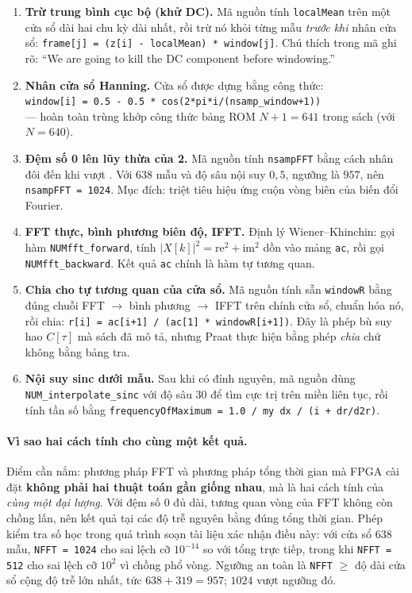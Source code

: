 \documentclass[11pt,a4paper]{article}
\begin{document}
\begin{enumerate}
    \setlength{\itemsep}{1.5pt}
    \item \textbf{Trừ trung bình cục bộ (khử DC).} Mã nguồn tính \texttt{localMean} trên một cửa sổ dài hai chu kỳ dài nhất, rồi trừ nó khỏi từng mẫu \emph{trước khi} nhân cửa sổ: \texttt{frame[j] = (z[i] - localMean) * window[j]}. Chú thích trong mã ghi rõ: ``We are going to kill the DC component before windowing.''
    \item \textbf{Nhân cửa sổ Hanning.} Cửa sổ được dựng bằng công thức:\\\texttt{window[i] = 0.5 - 0.5 * cos(2*pi*i/(nsamp\_window+1))}\\--- hoàn toàn trùng khớp công thức bảng ROM $N+1 = 641$ trong sách (với $N = 640$).
    \item \textbf{Đệm số 0 lên lũy thừa của 2.} Mã nguồn tính \texttt{nsampFFT} bằng cách nhân đôi đến khi vượt . Với $638$ mẫu và độ sâu nội suy $0{,}5$, ngưỡng là $957$, nên \texttt{nsampFFT = 1024}. Mục đích: triệt tiêu hiệu ứng cuộn vòng biên của biến đổi Fourier.
    \item \textbf{FFT thực, bình phương biên độ, IFFT.} Định lý Wiener--Khinchin: gọi hàm \texttt{NUMfft\_forward}, tính $|X[k]|^2 = \text{re}^2 + \text{im}^2$ dồn vào mảng \texttt{ac}, rồi gọi \texttt{NUMfft\_backward}. Kết quả \texttt{ac} chính là hàm tự tương quan.
    \item \textbf{Chia cho tự tương quan của cửa sổ.} Mã nguồn tính sẵn \texttt{windowR} bằng đúng chuỗi FFT $\to$ bình phương $\to$ IFFT trên chính cửa sổ, chuẩn hóa nó, rồi chia: \texttt{r[i] = ac[i+1] / (ac[1] * windowR[i+1])}. Đây là phép bù suy hao $C[\tau]$ mà sách đã mô tả, nhưng Praat thực hiện bằng phép \emph{chia} chứ không bằng bảng tra.
    \item \textbf{Nội suy sinc dưới mẫu.} Sau khi có đỉnh nguyên, mã nguồn dùng \texttt{NUM\_interpolate\_sinc} với độ sâu $30$ để tìm cực trị trên miền liên tục, rồi tính tần số bằng \texttt{frequencyOfMaximum = 1.0 / my dx / (i + dr/d2r)}.
\end{enumerate}

\paragraph{Vì sao hai cách tính cho cùng một kết quả.}
Điểm cần nắm: phương pháp FFT và phương pháp tổng thời gian mà FPGA cài đặt \textbf{không phải hai thuật toán gần giống nhau}, mà là hai cách tính của \emph{cùng một đại lượng}. Với đệm số 0 đủ dài, tương quan vòng của FFT không còn chồng lấn, nên kết quả tại các độ trễ nguyên bằng đúng tổng thời gian. Phép kiểm tra số học trong quá trình soạn tài liệu xác nhận điều này: với cửa sổ $638$ mẫu, \texttt{NFFT = 1024} cho sai lệch cỡ $10^{-14}$ so với tổng trực tiếp, trong khi \texttt{NFFT = 512} cho sai lệch cỡ $10^{2}$ vì chồng phổ vòng. Ngưỡng an toàn là \texttt{NFFT} $\ge$ độ dài cửa sổ cộng độ trễ lớn nhất, tức $638 + 319 = 957$; $1024$ vượt ngưỡng đó.
\end{document}
